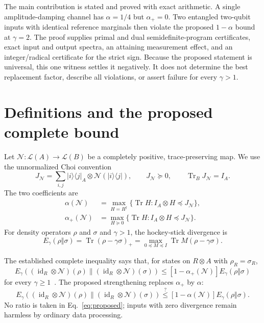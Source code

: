 \documentclass[11pt]{article}
\newcommand{\cN}{\mathcal N}
\newcommand{\id}{\operatorname{id}}
\newcommand{\Tr}{\operatorname{Tr}}
\newcommand{\dyad}[2]{\lvert #1\rangle\!\langle #2\rvert}
\newcommand{\psdle}{\preceq}
\newcommand{\psdge}{\succeq}
\begin{document}
The main contribution is stated and proved with exact arithmetic.  A single
amplitude-damping channel has $\alpha=1/4$ but $\alpha_+=0$.  Two entangled
two-qubit inputs with identical reference marginals then violate the proposed
$1-\alpha$ bound at $\gamma=2$.  The proof supplies primal and dual
semidefinite-program certificates, exact input and output spectra, an
attaining measurement effect, and an integer/radical certificate for the
strict sign.  Because the proposed statement is universal, this one witness
settles it negatively.  It does not determine the best replacement factor,
describe all violations, or assert failure for every $\gamma>1$.

\section{Definitions and the proposed complete bound}

Let $\cN:\mathcal L(A)\to\mathcal L(B)$ be a completely positive,
trace-preserving map.  We use the unnormalized Choi convention
\begin{equation}
 J_{\cN}=\sum_{i,j}\dyad{i}{j}_A\otimes\cN(\dyad{i}{j}),
 \qquad J_{\cN}\psdge0,\qquad \Tr_BJ_{\cN}=I_A .
 \label{eq:choi}
\end{equation}
The two coefficients are
\begin{align}
 \alpha(\cN)
 &=\max_{H=H^\dagger}\bigl\{\Tr H:I_A\otimes H\psdle J_{\cN}\bigr\},
 \label{eq:alpha}\\
 \alpha_+(\cN)
 &=\max_{H\psdge0}\bigl\{\Tr H:I_A\otimes H\psdle J_{\cN}\bigr\}.
 \label{eq:alphaplus}
\end{align}
For density operators $\rho$ and $\sigma$ and $\gamma>1$, the hockey-stick
divergence is
\begin{equation}
 E_\gamma(\rho\Vert\sigma)
 =\Tr(\rho-\gamma\sigma)_+
 =\max_{0\psdle M\psdle I}\Tr M(\rho-\gamma\sigma).
 \label{eq:hockey}
\end{equation}

The established complete inequality says that, for states on $R\otimes A$
with $\rho_R=\sigma_R$,
\begin{equation}
 E_\gamma\!\left((\id_R\otimes\cN)(\rho)\middle\|
                  (\id_R\otimes\cN)(\sigma)\right)
 \leq[1-\alpha_+(\cN)]E_\gamma(\rho\Vert\sigma)
 \label{eq:known}
\end{equation}
for every $\gamma\geq1$~\cite[Proposition~31]{GeorgeEtAl2026}.  The proposed
strengthening replaces $\alpha_+$ by $\alpha$:
\begin{equation}
 E_\gamma\!\left((\id_R\otimes\cN)(\rho)\middle\|
                  (\id_R\otimes\cN)(\sigma)\right)
 \stackrel{?}{\leq}[1-\alpha(\cN)]E_\gamma(\rho\Vert\sigma).
 \label{eq:proposed}
\end{equation}
No ratio is taken in Eq.~\eqref{eq:proposed}; inputs with zero divergence
remain harmless by ordinary data processing.
\end{document}
